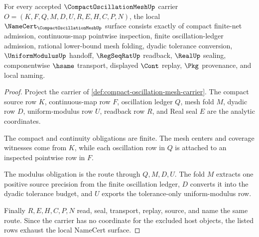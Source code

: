 \begin{theorem}
\label{thm:compact-oscillation-mesh-namecert-obligations}
For every accepted $\CompactOscillationMeshUp$ carrier $O=(K,F,Q,M,D,U,R,E,H,C,P,N)$, the local $\NameCert_{\CompactOscillationMeshUp}$ surface consists exactly of compact finite-net admission, continuous-map pointwise inspection, finite oscillation-ledger admission, rational lower-bound mesh folding, dyadic tolerance conversion, $\UniformModulusUp$ handoff, $\RegSeqRatUp$ readback, $\RealUp$ sealing, componentwise $\hsame$ transport, displayed $\Cont$ replay, $\Pkg$ provenance, and local naming.
\end{theorem}
\begin{proof}
Project the carrier of \autoref{def:compact-oscillation-mesh-carrier}. The compact source row $K$, continuous-map row $F$, oscillation ledger $Q$, mesh fold $M$, dyadic row $D$, uniform-modulus row $U$, readback row $R$, and Real seal $E$ are the analytic coordinates.

The compact and continuity obligations are finite. The mesh centers and coverage witnesses come from $K$, while each oscillation row in $Q$ is attached to an inspected pointwise row in $F$.

The modulus obligation is the route through $Q,M,D,U$. The fold $M$ extracts one positive source precision from the finite oscillation ledger, $D$ converts it into the dyadic tolerance budget, and $U$ exports the tolerance-only uniform-modulus row.

Finally $R,E,H,C,P,N$ read, seal, transport, replay, source, and name the same route. Since the carrier has no coordinate for the excluded host objects, the listed rows exhaust the local NameCert surface.
\end{proof}

